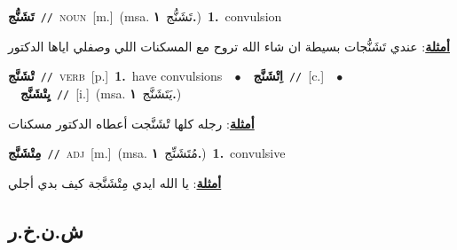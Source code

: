 \documentclass[10pt,a4paper,twoside]{article} %
\begin{document}
\begin{multicols}{2}
{\setlength\topsep{0pt}\textbf{\foreignlanguage{arabic}{تَشَنُّج}}\ {\color{gray}\texttt{//}\color{black}}\ \textsc{noun}\ [m.]\ \color{gray}(msa. \foreignlanguage{arabic}{تَشَنُّج}~\foreignlanguage{arabic}{\textbf{١.}})\color{black}\ \textbf{1.}~convulsion\  \begin{flushright}\color{gray}\foreignlanguage{arabic}{\textbf{\underline{\foreignlanguage{arabic}{أمثلة}}}: عندي تَشَنُّجات بسيطة ان شاء الله تروح مع المسكنات اللي وصفلي اياها الدكتور}\end{flushright}\color{black}} \vspace{2mm}

{\setlength\topsep{0pt}\textbf{\foreignlanguage{arabic}{تْشَنَّج}}\ {\color{gray}\texttt{//}\color{black}}\ \textsc{verb}\ [p.]\ \textbf{1.}~have convulsions\ \ $\bullet$\ \ \setlength\topsep{0pt}\textbf{\foreignlanguage{arabic}{اِتْشَنَّج}}\ {\color{gray}\texttt{//}\color{black}}\ [c.]\ \ $\bullet$\ \ \setlength\topsep{0pt}\textbf{\foreignlanguage{arabic}{يِتْشَنَّج}}\ {\color{gray}\texttt{//}\color{black}}\ [i.]\ \color{gray}(msa. \foreignlanguage{arabic}{يَتَشَنَّج}~\foreignlanguage{arabic}{\textbf{١.}})\color{black}\  \begin{flushright}\color{gray}\foreignlanguage{arabic}{\textbf{\underline{\foreignlanguage{arabic}{أمثلة}}}: رجله كلها تْشَنَّجت أعطاه الدكتور مسكنات}\end{flushright}\color{black}} \vspace{2mm}

{\setlength\topsep{0pt}\textbf{\foreignlanguage{arabic}{مِتْشَنَّج}}\ {\color{gray}\texttt{//}\color{black}}\ \textsc{adj}\ [m.]\ \color{gray}(msa. \foreignlanguage{arabic}{مُتَشَنِّج}~\foreignlanguage{arabic}{\textbf{١.}})\color{black}\ \textbf{1.}~convulsive\  \begin{flushright}\color{gray}\foreignlanguage{arabic}{\textbf{\underline{\foreignlanguage{arabic}{أمثلة}}}: يا الله ايدي مِتْشَنَّجة كيف بدي أجلي}\end{flushright}\color{black}} \vspace{2mm}

\vspace{-3mm}
\subsection*{\color{blue}\foreignlanguage{arabic}{ش.ن.خ.ر}\color{blue}{}} 


\end{multicols}
\end{document}
